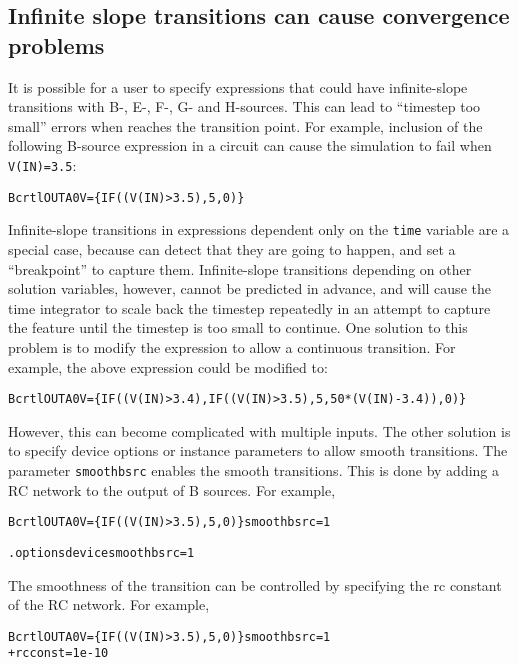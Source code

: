 \subsection{Infinite slope transitions can cause convergence problems}

It is possible for a user to specify expressions that could have
infinite-slope transitions with B-, E-, F-, G- and H-sources.  This
can lead to ``timestep too small'' errors when \Xyce{} reaches the
transition point.  For example, inclusion of the following B-source
expression in a circuit can cause the simulation to fail when
\texttt{V(IN)=3.5}:
\begin{alltt} Bcrtl OUTA 0 V=\{ IF( (V(IN) > 3.5), 5, 0 ) \} \end{alltt}

Infinite-slope transitions in expressions dependent only on the
\texttt{time} variable are a special case, because \Xyce{} can detect
that they are going to happen, and set a ``breakpoint'' to capture
them.  Infinite-slope transitions depending on other solution
variables, however, cannot be predicted in advance, and will cause the
time integrator to scale back the timestep repeatedly in an attempt to
capture the feature until the timestep is too small to continue. One
solution to this problem is to modify the expression to allow a
continuous transition. For example, the above expression could be
modified to:
\begin{alltt} Bcrtl OUTA 0 V=\{IF( (V(IN) > 3.4), IF( (V(IN) > 3.5), 5, 50*(V(IN)-3.4) ), 0 )\}\end{alltt}

However, this can become complicated with multiple inputs. The other
solution is to specify device options or instance parameters to allow
smooth transitions. The parameter \texttt{smoothbsrc} enables the
smooth transitions. This is done by adding a RC network to the output
of B sources. For example,

\begin{alltt} Bcrtl OUTA 0 V=\{ IF( (V(IN) > 3.5), 5, 0 ) \} smoothbsrc=1 \end{alltt}

\begin{alltt} .options device  smoothbsrc=1 \end{alltt}

The smoothness of the transition can be controlled by specifying the
rc constant of the RC network. For example,

\begin{alltt} Bcrtl OUTA 0 V=\{ IF( (V(IN) > 3.5), 5, 0 ) \} smoothbsrc=1   
 + rcconst = 1e-10 \end{alltt}

